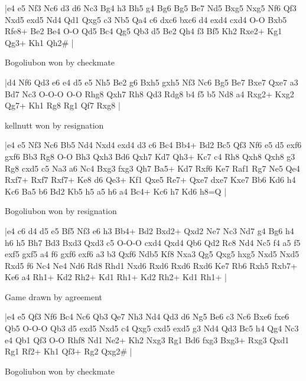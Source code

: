 \makegametitle
|e4 e5 Nf3 Nc6 d3 d6 Nc3 Bg4 h3 Bh5 g4 Bg6 Bg5 Be7 Nd5 Bxg5 Nxg5 Nf6 Qf3 Nxd5 exd5 Nd4 Qd1 Qxg5 c3 Nb5 Qa4 c6 dxc6 bxc6 d4 exd4 cxd4 O-O Bxb5 Rfe8+ Be2 Be4 O-O Qd5 Bc4 Qg5 Qb3 d5 Be2 Qh4 f3 Bf5 Kh2 Rxe2+ Kg1 Qg3+ Kh1 Qh2\#  |

\showboard

Bogoliubon won by checkmate

\makegametitle
|d4 Nf6 Qd3 e6 e4 d5 e5 Nh5 Be2 g6 Bxh5 gxh5 Nf3 Nc6 Bg5 Be7 Bxe7 Qxe7 a3 Bd7 Nc3 O-O-O O-O Rhg8 Qxh7 Rh8 Qd3 Rdg8 b4 f5 b5 Nd8 a4 Rxg2+ Kxg2 Qg7+ Kh1 Rg8 Rg1 Qf7 Rxg8  |

\showboard

kellnutt won by resignation

\makegametitle
|e4 e5 Nf3 Nc6 Bb5 Nd4 Nxd4 exd4 d3 c6 Bc4 Bb4+ Bd2 Bc5 Qf3 Nf6 e5 d5 exf6 gxf6 Bb3 Rg8 O-O Bh3 Qxh3 Bd6 Qxh7 Kd7 Qh3+ Kc7 c4 Rh8 Qxh8 Qxh8 g3 Rg8 cxd5 c5 Na3 a6 Nc4 Bxg3 fxg3 Qh7 Ba5+ Kd7 Rxf6 Ke7 Raf1 Rg7 Ne5 Qe4 Rxf7+ Rxf7 Rxf7+ Ke8 d6 Qe3+ Kf1 Qxe5 Re7+ Qxe7 dxe7 Kxe7 Bb6 Kd6 h4 Kc6 Ba5 b6 Bd2 Kb5 h5 a5 h6 a4 Bc4+ Kc6 h7 Kd6 h8=Q  |

\showboard

Bogoliubon won by resignation

\makegametitle
|e4 c6 d4 d5 e5 Bf5 Nf3 e6 h3 Bb4+ Bd2 Bxd2+ Qxd2 Ne7 Nc3 Nd7 g4 Bg6 h4 h6 h5 Bh7 Bd3 Bxd3 Qxd3 c5 O-O-O cxd4 Qxd4 Qb6 Qd2 Rc8 Nd4 Nc5 f4 a5 f5 exf5 gxf5 a4 f6 gxf6 exf6 a3 b3 Qxf6 Ndb5 Kf8 Nxa3 Qg5 Qxg5 hxg5 Nxd5 Nxd5 Rxd5 f6 Nc4 Ne4 Nd6 Rd8 Rhd1 Nxd6 Rxd6 Rxd6 Rxd6 Ke7 Rb6 Rxh5 Rxb7+ Ke6 a4 Rh1+ Kd2 Rh2+ Kd1 Rh1+ Kd2 Rh2+ Kd1 Rh1+  |

\showboard

Game drawn by agreement

\makegametitle
|e4 e5 Qf3 Nf6 Bc4 Nc6 Qb3 Qe7 Nh3 Nd4 Qd3 d6 Ng5 Be6 c3 Nc6 Bxe6 fxe6 Qb5 O-O-O Qb3 d5 exd5 Nxd5 c4 Qxg5 cxd5 exd5 g3 Nd4 Qd3 Bc5 h4 Qg4 Nc3 e4 Qb1 Qf3 O-O Rhf8 Nd1 Ne2+ Kh2 Nxg3 Rg1 Bd6 fxg3 Bxg3+ Rxg3 Qxd1 Rg1 Rf2+ Kh1 Qf3+ Rg2 Qxg2\#  |

\showboard

Bogoliubon won by checkmate

